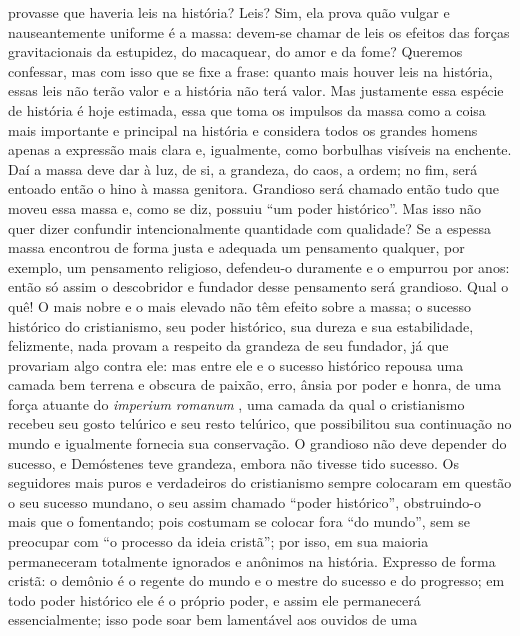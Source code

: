     provasse que haveria leis na história? Leis? Sim, ela prova quão
    vulgar e nauseantemente uniforme é a massa: devem-se chamar de leis
    os efeitos das forças gravitacionais da estupidez, do macaquear, do
    amor e da fome? Queremos confessar, mas com isso que se fixe a
    frase: quanto mais houver leis na história, essas leis não terão
    valor e a história não terá valor. Mas justamente essa espécie de
    história é hoje estimada, essa que toma os impulsos da massa como a
    coisa mais importante e principal na história e considera todos os
    grandes homens apenas a expressão mais clara e, igualmente, como
    borbulhas visíveis na enchente. Daí a massa deve dar à luz, de si, a
    grandeza, do caos, a ordem; no fim, será entoado então o hino à
    massa genitora. Grandioso será chamado então tudo que moveu essa
    massa e, como se diz, possuiu ``um poder histórico''. Mas isso não
    quer dizer confundir intencionalmente quantidade com qualidade? Se a
    espessa massa encontrou de forma justa e adequada um pensamento
    qualquer, por exemplo, um pensamento religioso, defendeu-o duramente
    e o empurrou por anos: então só assim o descobridor e fundador desse
    pensamento será grandioso. Qual o quê! O mais nobre e o mais elevado
    não têm efeito sobre a massa; o sucesso histórico do cristianismo,
    seu poder histórico, sua dureza e sua estabilidade, felizmente, nada
    provam a respeito da grandeza de seu fundador, já que provariam algo
    contra ele: mas entre ele e o sucesso histórico repousa uma camada
    bem terrena e obscura de paixão, erro, ânsia por poder e honra, de
    uma força atuante do \emph{imperium romanum}
    , uma camada da qual o
    cristianismo recebeu seu gosto telúrico e seu resto telúrico, que
    possibilitou sua continuação no mundo e igualmente fornecia sua
    conservação. O grandioso não deve depender do sucesso, e Demóstenes
    teve grandeza, embora não tivesse tido sucesso. Os seguidores mais
    puros e verdadeiros do cristianismo sempre colocaram em questão o
    seu sucesso mundano, o seu assim chamado ``poder histórico'',
    obstruindo-o mais que o fomentando; pois costumam se colocar fora
    ``do mundo'', sem se preocupar com ``o processo da ideia cristã'';
    por isso, em sua maioria permaneceram totalmente ignorados e
    anônimos na história. Expresso de forma cristã: o demônio é o
    regente do mundo e o mestre do sucesso e do progresso; em todo poder
    histórico ele é o próprio poder, e assim ele permanecerá
    essencialmente; isso pode soar bem lamentável aos ouvidos de uma
